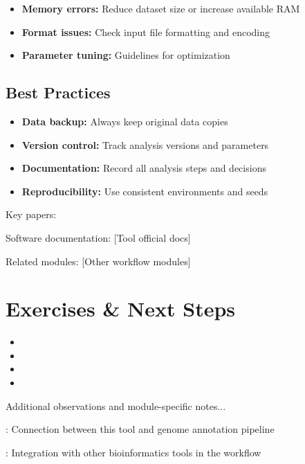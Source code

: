 \documentclass[a4paper,11pt]{article}
\begin{document}
\begin{itemize}
    \item \textbf{Memory errors:} Reduce dataset size or increase available RAM
    \item \textbf{Format issues:} Check input file formatting and encoding
    \item \textbf{Parameter tuning:} Guidelines for optimization
\end{itemize}

\subsection{Best Practices}
\begin{itemize}
    \item \textbf{Data backup:} Always keep original data copies
    \item \textbf{Version control:} Track analysis versions and parameters
    \item \textbf{Documentation:} Record all analysis steps and decisions
    \item \textbf{Reproducibility:} Use consistent environments and seeds
\end{itemize}

\begin{references}
    \item Key papers: \cite{example2024,author2024,smith2024}
    \item Software documentation: [Tool official docs]
    \item Related modules: [Other workflow modules]
\end{references}

\section{Exercises \& Next Steps}

\begin{itemize}
    \item {}
    \item {}
    \item {}
    \item {}
\end{itemize}

\begin{notes}
Additional observations and module-specific notes...

: Connection between this tool and genome annotation pipeline

: Integration with other bioinformatics tools in the workflow

\end{notes}

\newpage
\printbibliography
\end{document}
